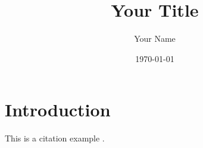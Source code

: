 \documentclass{article}
\begin{document}
\title{Your Title}
\author{Your Name}
\date{\today}
\maketitle

\section{Introduction}
This is a citation example \cite{apostol1976}.

\printbibliography %
\end{document}
